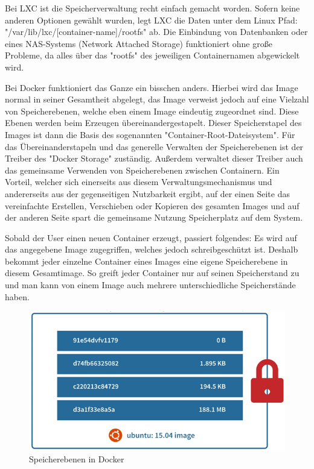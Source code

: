 
Bei LXC ist die Speicherverwaltung recht einfach gemacht worden. Sofern keine anderen Optionen gewählt wurden, legt LXC die Daten unter dem Linux Pfad: "/var\-/lib\-/lxc\-/[container-name]/rootfs" ab. Die Einbindung von Datenbanken oder eines NAS-Systems (Network Attached Storage) funktioniert ohne große Probleme, da alles über das "rootfs" des jeweiligen Containernamen abgewickelt wird. \cite{LxcVsDocker}

Bei Docker funktioniert das Ganze ein bisschen anders. Hierbei wird das Image normal in seiner Gesamtheit abgelegt, das Image verweist jedoch auf eine Vielzahl von Speicherebenen, welche eben einem Image eindeutig zugeordnet sind. Diese Ebenen werden beim Erzeugen übereinandergestapelt. Dieser Speicherstapel des Images ist dann die Basis des sogenannten "Container-Root-Dateisystem". Für das Übereinanderstapeln und das generelle Verwalten der Speicherebenen ist der Treiber des "Docker Storage" zuständig. Außerdem verwaltet dieser Treiber auch das gemeinsame Verwenden von Speicherebenen zwischen Containern. Ein Vorteil, welcher sich einerseits aus diesem Verwaltungsmechanismus und andererseits aus der gegenseitigen Nutzbarkeit ergibt, auf der einen Seite das vereinfachte Erstellen, Verschieben oder Kopieren des gesamten Images und auf der anderen Seite spart die gemeinsame Nutzung Speicherplatz auf dem System. \cite{LxcVsDocker}

Sobald der User einen neuen Container erzeugt, passiert folgendes: Es wird auf das angegebene Image zugegriffen, welches jedoch schreibgeschützt ist. Deshalb bekommt jeder einzelne Container eines Images eine eigene Speicherebene in diesem Gesamtimage. So greift jeder Container nur auf seinen Speicherstand zu und man kann von einem Image auch mehrere unterschiedliche Speicherstände haben. \cite{LxcVsDocker}

\begin{figure}[H]
    \centering
    \includegraphics{media/DockerAndContainering/Speicherebenen.png}
    \caption{Speicherebenen in Docker \cite{LxcVsDocker}}
\end{figure}

